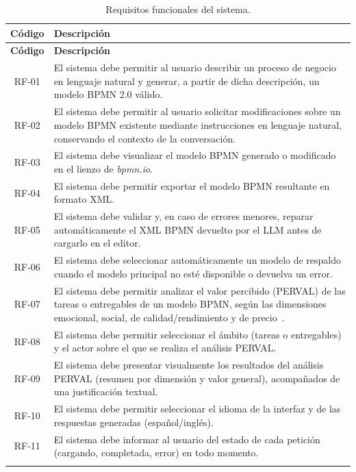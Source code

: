 {\begin{longtable}{|c|p{11.5cm}|}
\hline
\rowcolor{gray!20} \textbf{Código} & \textbf{Descripción} \\
\hline
\endfirsthead
\hline
\rowcolor{gray!20} \textbf{Código} & \textbf{Descripción} \\
\hline
\endhead
RF-01 & El sistema debe permitir al usuario describir un proceso de negocio en lenguaje natural y generar, a partir de dicha descripción, un modelo BPMN 2.0 válido. \\
\hline
RF-02 & El sistema debe permitir al usuario solicitar modificaciones sobre un modelo BPMN existente mediante instrucciones en lenguaje natural, conservando el contexto de la conversación. \\
\hline
RF-03 & El sistema debe visualizar el modelo BPMN generado o modificado en el lienzo de \textit{bpmn.io}. \\
\hline
RF-04 & El sistema debe permitir exportar el modelo BPMN resultante en formato XML. \\
\hline
RF-05 & El sistema debe validar y, en caso de errores menores, reparar automáticamente el XML BPMN devuelto por el LLM antes de cargarlo en el editor. \\
\hline
RF-06 & El sistema debe seleccionar automáticamente un modelo de respaldo cuando el modelo principal no esté disponible o devuelva un error. \\
\hline
RF-07 & El sistema debe permitir analizar el valor percibido (PERVAL) de las tareas o entregables de un modelo BPMN, según las dimensiones emocional, social, de calidad/rendimiento y de precio~\cite{sweeney2001perval}. \\
\hline
RF-08 & El sistema debe permitir seleccionar el ámbito (tareas o entregables) y el actor sobre el que se realiza el análisis PERVAL. \\
\hline
RF-09 & El sistema debe presentar visualmente los resultados del análisis PERVAL (resumen por dimensión y valor general), acompañados de una justificación textual. \\
\hline
RF-10 & El sistema debe permitir seleccionar el idioma de la interfaz y de las respuestas generadas (español/inglés). \\
\hline
RF-11 & El sistema debe informar al usuario del estado de cada petición (cargando, completada, error) en todo momento. \\
\hline
\caption{Requisitos funcionales del sistema.}
\label{tab:requisitosFuncionales}
\end{longtable}


}
